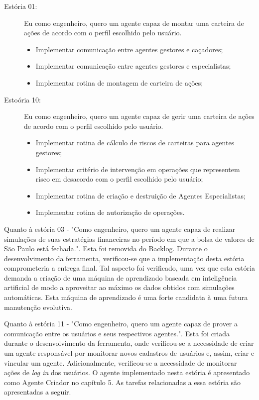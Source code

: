 \begin{description}
\item[Estória 01:]
Eu como engenheiro, quero um agente capaz de montar uma carteira de ações de acordo com o perfil escolhido pelo usuário.

\begin{itemize}
		\item Implementar comunicação entre agentes gestores e caçadores;
		\item Implementar comunicação entre agentes gestores e especialistas;
		\item Implementar rotina de montagem de carteira de ações;
		

\end{itemize}

\item[Estoória 10:]
Eu como engenheiro, quero um agente capaz de gerir uma carteira de ações de acordo com o perfil escolhido pelo usuário.
\begin{itemize}

	\item Implementar rotina de cálculo de riscos de carteiras para agentes gestores;
	\item Implementar critério de intervenção em operações que representem risco em desacordo com o perfil escolhido pelo usuário;
	\item Implementar rotina de criação e destruição de Agentes Especialistas;
	\item Implementar rotina de autorização de operações.

\end{itemize}
\end{description}

Quanto à estória 03 - "Como engenheiro, quero um agente capaz de realizar simulações de suas estratégias financeiras no período em que a bolsa de valores de São Paulo está fechada.". Esta foi removida do Backlog. Durante o desenvolvimento da ferramenta, verificou-se que a implementação desta estória comprometeria a entrega final. Tal aspecto foi verificado, uma vez que esta estória demanda a criação de uma máquina de aprendizado baseada em inteligência artificial de modo a aproveitar ao máximo os dados obtidos com simulações automáticas. Esta máquina de aprendizado é uma forte candidata à uma futura manutenção evolutiva.

Quanto à estória 11 - "Como engenheiro, quero um agente capaz de prover a comunicação entre os usuários e seus respectivos agentes.". Esta foi criada durante o desenvolvimento da ferramenta, onde verificou-se a necessidade de criar um agente responsável por monitorar novos cadastros de usuários e, assim, criar e vincular um agente. Adicionalmente, verificou-se a necessidade de monitorar ações de \textit{log in} dos usuários. O agente implementado nesta estória é apresentado como Agente Criador no capítulo 5. As tarefas relacionadas a essa estória são apresentadas a seguir.

